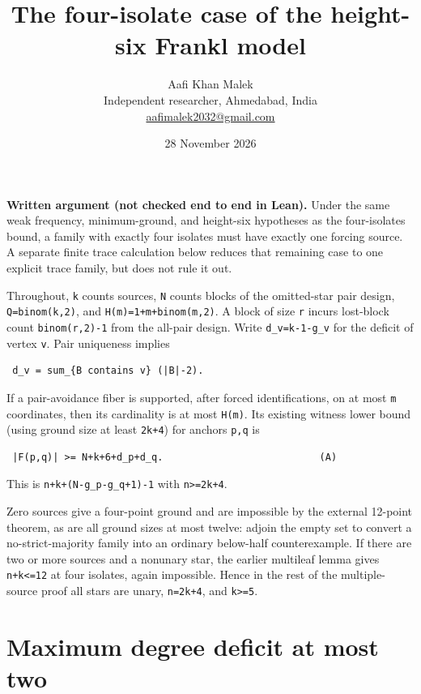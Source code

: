 \documentclass[11pt,letterpaper]{article}
\title{The four-isolate case of the height-six Frankl model}
\author{Aafi Khan Malek\\ \small Independent researcher, Ahmedabad, India\\
\small\href{mailto:aafimalek2032@gmail.com}{aafimalek2032@gmail.com}}
\date{28 November 2026}
\begin{document}
\maketitle
\textbf{Written argument (not checked end to end in Lean).} Under the
same weak frequency, minimum-ground, and height-six hypotheses as the
four-isolates bound, a family with exactly four isolates must have
exactly one forcing source. A separate finite trace calculation below
reduces that remaining case to one explicit trace family, but does not
rule it out.

Throughout, \texttt{k} counts sources, \texttt{N} counts blocks of the
omitted-star pair design, \texttt{Q=binom(k,2)}, and
\texttt{H(m)=1+m+binom(m,2)}. A block of size \texttt{r} incurs
lost-block count \texttt{binom(r,2)-1} from the all-pair design. Write
\texttt{d\_v=k-1-g\_v} for the deficit of vertex \texttt{v}. Pair
uniqueness implies

\begin{verbatim}
 d_v = sum_{B contains v} (|B|-2).
\end{verbatim}

If a pair-avoidance fiber is supported, after forced identifications, on
at most \texttt{m} coordinates, then its cardinality is at most
\texttt{H(m)}. Its existing witness lower bound (using ground size at
least \texttt{2k+4}) for anchors \texttt{p,q} is

\begin{verbatim}
 |F(p,q)| >= N+k+6+d_p+d_q.                           (A)
\end{verbatim}

This is \texttt{n+k+(N-g\_p-g\_q+1)-1} with
\texttt{n\textgreater{}=2k+4}.

Zero sources give a four-point ground and are impossible by the external
12-point theorem, as are all ground sizes at most twelve: adjoin the
empty set to convert a no-strict-majority family into an ordinary
below-half counterexample. If there are two or more sources and a
nonunary star, the earlier multileaf lemma gives
\texttt{n+k\textless{}=12} at four isolates, again impossible. Hence in
the rest of the multiple-source proof all stars are unary,
\texttt{n=2k+4}, and \texttt{k\textgreater{}=5}.

\section{Maximum degree deficit at most
two}\label{1-maximum-degree-deficit-at-most-two}
\end{document}
